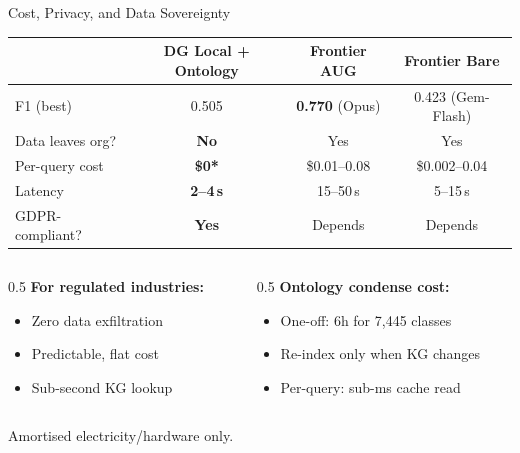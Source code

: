 \documentclass[aspectratio=169,11pt]{beamer}
\begin{document}
\begin{frame}{Cost, Privacy, and Data Sovereignty}
\centering
\small
\begin{tabular}{lccc}
\toprule
& \textbf{DG Local + Ontology} & \textbf{Frontier AUG} & \textbf{Frontier Bare} \\
\midrule
F1 (best) & 0.505 & \textbf{0.770} (Opus) & 0.423 (Gem-Flash) \\
Data leaves org? & \textcolor{softgreen}{\textbf{No}} & Yes & Yes \\
Per-query cost & \textcolor{softgreen}{\textbf{\$0*}} & \$0.01--0.08 & \$0.002--0.04 \\
Latency & \textcolor{softgreen}{\textbf{2--4\,s}} & 15--50\,s & 5--15\,s \\
GDPR-compliant? & \textcolor{softgreen}{\textbf{Yes}} & Depends & Depends \\
\bottomrule
\end{tabular}

\vspace{5mm}
\begin{columns}
\begin{column}{0.5\textwidth}
\textbf{For regulated industries:}
\begin{itemize}
\item Zero data exfiltration
\item Predictable, flat cost
\item Sub-second KG lookup
\end{itemize}
\end{column}
\begin{column}{0.5\textwidth}
\textbf{Ontology condense cost:}
\begin{itemize}
\item One-off: 6h for 7{,}445 classes
\item Re-index only when KG changes
\item Per-query: sub-ms cache read
\end{itemize}
\end{column}
\end{columns}

\vspace{2mm}
{\tiny *Amortised electricity/hardware only.}
\end{frame}
\end{document}
